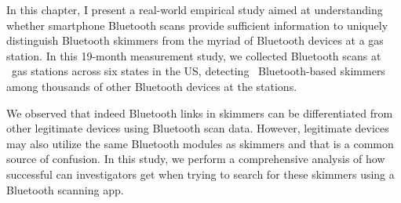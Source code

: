 
%
%
% 

In this chapter, I present a real-world empirical study aimed at understanding whether smartphone Bluetooth scans provide sufficient information to uniquely distinguish Bluetooth skimmers from the myriad of Bluetooth devices at a gas station.
%
In this 19-month measurement study, we collected Bluetooth scans at \visitedgasstations~gas stations across six states in the US, detecting \totalskimmers~Bluetooth-based skimmers among thousands of other Bluetooth devices at the stations. 
%

We observed that indeed Bluetooth links in skimmers can be differentiated from other legitimate devices using Bluetooth scan data.
%
However, legitimate devices may also utilize the same Bluetooth modules as skimmers and that is a common source of confusion.
%
In this study, we perform a comprehensive analysis of how successful can investigators get when trying to search for these skimmers using a Bluetooth scanning app.



